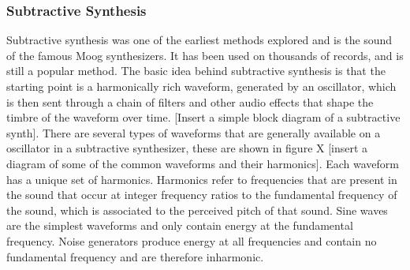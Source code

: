 \subsubsection{Subtractive Synthesis}
Subtractive synthesis was one of the earliest methods explored and is the sound of the famous Moog synthesizers. It has been used on thousands of records, and is still a popular method. The basic idea behind subtractive synthesis is that the starting point is a harmonically rich waveform, generated by an oscillator, which is then sent through a chain of filters and other audio effects that shape the timbre of the waveform over time. [Insert a simple block diagram of a subtractive synth]. There are several types of waveforms that are generally available on a oscillator in a subtractive synthesizer, these are shown in figure X [insert a diagram of some of the common waveforms and their harmonics]. Each waveform has a unique set of harmonics. Harmonics refer to frequencies that are present in the sound that occur at integer frequency ratios to the fundamental frequency of the sound, which is associated to the perceived pitch of that sound. Sine waves are the simplest waveforms and only contain energy at the fundamental frequency. Noise generators produce energy at all frequencies and contain no fundamental frequency and are therefore inharmonic.


